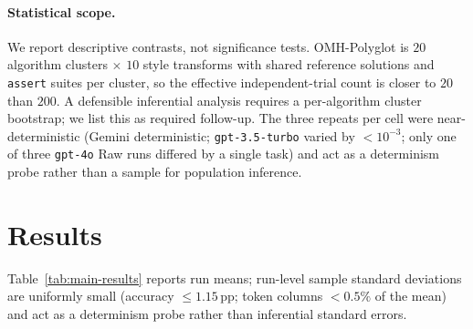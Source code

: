 \documentclass[11pt,a4paper,twocolumn]{article}
\begin{document}
\paragraph{Statistical scope.} We report descriptive contrasts, not significance tests. OMH-Polyglot is $20$ algorithm clusters $\times$ $10$ style transforms with shared reference solutions and \texttt{assert} suites per cluster, so the effective independent-trial count is closer to $20$ than $200$. A defensible inferential analysis requires a per-algorithm cluster bootstrap; we list this as required follow-up. The three repeats per cell were near-deterministic (Gemini deterministic; \texttt{gpt-3.5-turbo} varied by $<10^{-3}$; only one of three \texttt{gpt-4o} Raw runs differed by a single task) and act as a determinism probe rather than a sample for population inference.

\section{Results}
\label{sec:results}

Table~\ref{tab:main-results} reports run means; run-level sample standard deviations are uniformly small (accuracy $\le 1.15$\,pp; token columns $<0.5\%$ of the mean) and act as a determinism probe rather than inferential standard errors.
\end{document}
